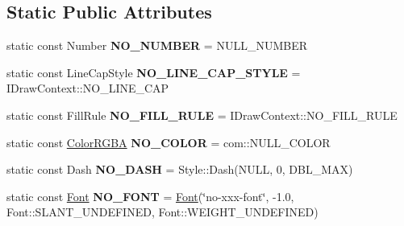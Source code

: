 \subsection*{Static Public Attributes}
\begin{DoxyCompactItemize}
\item 
\hypertarget{classsambag_1_1disco_1_1graphic_elements_1_1_style_aec14534505326b9a9c923fd715915c30}{
static const Number {\bfseries NO\_\-NUMBER} = NULL\_\-NUMBER}
\label{classsambag_1_1disco_1_1graphic_elements_1_1_style_aec14534505326b9a9c923fd715915c30}

\item 
\hypertarget{classsambag_1_1disco_1_1graphic_elements_1_1_style_a33c0725d93deb114028a7804a9fc57cd}{
static const LineCapStyle {\bfseries NO\_\-LINE\_\-CAP\_\-STYLE} = IDrawContext::NO\_\-LINE\_\-CAP}
\label{classsambag_1_1disco_1_1graphic_elements_1_1_style_a33c0725d93deb114028a7804a9fc57cd}

\item 
\hypertarget{classsambag_1_1disco_1_1graphic_elements_1_1_style_a6687438c368942595c27703c303d1497}{
static const FillRule {\bfseries NO\_\-FILL\_\-RULE} = IDrawContext::NO\_\-FILL\_\-RULE}
\label{classsambag_1_1disco_1_1graphic_elements_1_1_style_a6687438c368942595c27703c303d1497}

\item 
\hypertarget{classsambag_1_1disco_1_1graphic_elements_1_1_style_ad0185d259a7e0a53e64b48a84f38fc12}{
static const \hyperlink{structsambag_1_1com_1_1_color_r_g_b_a}{ColorRGBA} {\bfseries NO\_\-COLOR} = com::NULL\_\-COLOR}
\label{classsambag_1_1disco_1_1graphic_elements_1_1_style_ad0185d259a7e0a53e64b48a84f38fc12}

\item 
\hypertarget{classsambag_1_1disco_1_1graphic_elements_1_1_style_a0759f4b2dbd9b872614f043a5820417b}{
static const Dash {\bfseries NO\_\-DASH} = Style::Dash(NULL, 0, DBL\_\-MAX)}
\label{classsambag_1_1disco_1_1graphic_elements_1_1_style_a0759f4b2dbd9b872614f043a5820417b}

\item 
\hypertarget{classsambag_1_1disco_1_1graphic_elements_1_1_style_aba10a3a7c3b2c1b73cd661f1f9bc3399}{
static const \hyperlink{structsambag_1_1disco_1_1_font}{Font} {\bfseries NO\_\-FONT} = \hyperlink{structsambag_1_1disco_1_1_font}{Font}(\char`\"{}no-\/xxx-\/font\char`\"{}, -\/1.0, Font::SLANT\_\-UNDEFINED, Font::WEIGHT\_\-UNDEFINED)}
\label{classsambag_1_1disco_1_1graphic_elements_1_1_style_aba10a3a7c3b2c1b73cd661f1f9bc3399}


\end{DoxyCompactItemize}
